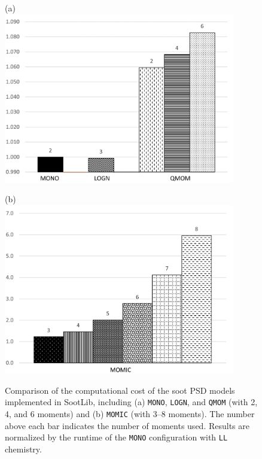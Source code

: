 \documentclass[preprint,letterpaper]{elsarticle}
\begin{document}
\begin{figure}[ht]
    \caption{Comparison of the computational cost of the soot PSD models implemented in SootLib, including (a) \texttt{MONO}, \texttt{LOGN}, and \texttt{QMOM} (with 2, 4, and 6 moments) and (b) \texttt{MOMIC} (with 3--8 moments). The number above each bar indicates the number of moments used. Results are normalized by the runtime of the \texttt{MONO} configuration with \texttt{LL} chemistry.}
    \label{f:cost_PSD}
    \begin{minipage}{0.5\textwidth}
        \centering
        (a) \\ \includegraphics[width=0.9\textwidth]{../figures/comp_cost_PSDa}
    \end{minipage}
    \begin{minipage}{0.5\textwidth}
        \centering
        (b) \\ \includegraphics[width=0.9\textwidth]{../figures/comp_cost_PSDb}
    \end{minipage}
\end{figure}
\end{document}
